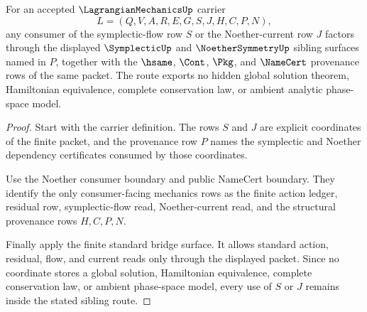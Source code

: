 \begin{theorem}
\label{thm:lagrangianmechanics-symplectic-noether-sibling-route}
For an accepted $\LagrangianMechanicsUp$ carrier
$$
L=(Q,V,A,R,E,G,S,J,H,C,P,N),
$$
any consumer of the symplectic-flow row $S$ or the Noether-current row $J$
factors through the displayed $\SymplecticUp$ and $\NoetherSymmetryUp$ sibling
surfaces named in $P$, together with the $\hsame$, $\Cont$, $\Pkg$, and
$\NameCert$ provenance rows of the same packet. The route exports no hidden
global solution theorem, Hamiltonian equivalence, complete conservation law, or
ambient analytic phase-space model.
\end{theorem}
\begin{proof}
Start with the carrier definition. The rows $S$ and $J$ are explicit
coordinates of the finite packet, and the provenance row $P$ names the
symplectic and Noether dependency certificates consumed by those coordinates.

Use the Noether consumer boundary and public NameCert boundary. They identify
the only consumer-facing mechanics rows as the finite action ledger, residual
row, symplectic-flow read, Noether-current read, and the structural provenance
rows $H,C,P,N$.

Finally apply the finite standard bridge surface. It allows standard action,
residual, flow, and current reads only through the displayed packet. Since no
coordinate stores a global solution, Hamiltonian equivalence, complete
conservation law, or ambient phase-space model, every use of $S$ or $J$ remains
inside the stated sibling route.
\end{proof}


